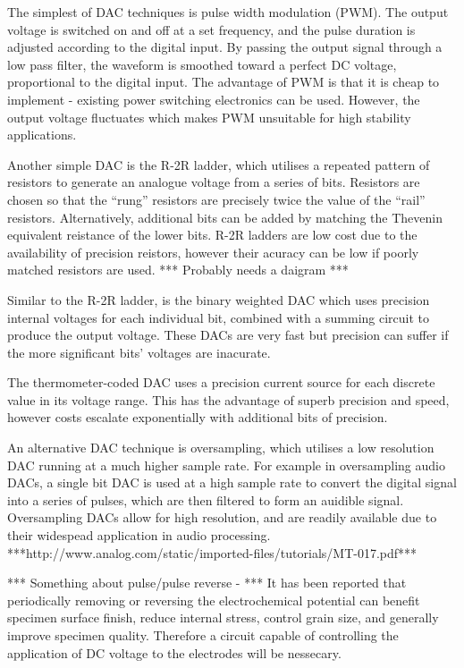 The simplest of DAC techniques is pulse width modulation (PWM). The output voltage is switched on and off at a set frequency, and the pulse duration is adjusted according to the digital input. By passing the output signal through a low pass filter, the waveform is smoothed toward a perfect DC voltage, proportional to the digital input. The advantage of PWM is that it is cheap to implement - existing power switching electronics can be used. However, the output voltage fluctuates which makes PWM unsuitable for high stability applications.

Another simple DAC is the R-2R ladder, which utilises a repeated pattern of resistors to generate an analogue voltage from a series of bits. Resistors are chosen so that the ``rung'' resistors are precisely twice the value of the ``rail'' resistors. Alternatively, additional bits can be added by matching the Thevenin equivalent reistance of the lower bits. R-2R ladders are low cost due to the availability of precision reistors, however their acuracy can be low if poorly matched resistors are used. *** Probably needs a daigram ***

Similar to the R-2R ladder, is the binary weighted DAC which uses precision internal voltages for each individual bit, combined with a summing circuit to produce the output voltage. These DACs are very fast but precision can suffer if the more significant bits' voltages are inacurate.


The thermometer-coded DAC uses a precision current source for each discrete value in its voltage range. This has the advantage of superb precision and speed, however costs escalate exponentially with additional bits of precision.

An alternative DAC technique is oversampling, which utilises a low resolution DAC running at a much higher sample rate. For example in oversampling audio DACs, a single bit DAC is used at a high sample rate to convert the digital signal into a series of pulses, which are then filtered to form an auidible signal. Oversampling DACs allow for high resolution, and are readily available due to their widespead application in audio processing.
***http://www.analog.com/static/imported-files/tutorials/MT-017.pdf***

*** Something about pulse/pulse reverse -  ***
It has been reported \cite{Chandrasekar} that periodically removing or reversing the electrochemical potential can benefit specimen surface finish, reduce internal stress, control grain size, and generally improve specimen quality. Therefore a circuit capable of controlling the application of DC voltage to the electrodes will be nessecary.

